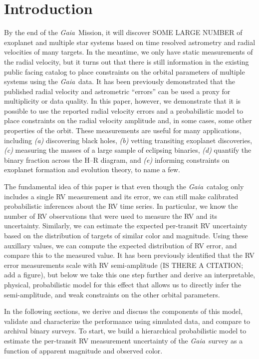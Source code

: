 \documentclass[modern, letterpaper]{aastex631}
\newcommand{\project}[1]{\textsl{#1}}
\newcommand{\Gaia}{\project{Gaia}}
\begin{document}

\section{Introduction} \label{sec:intro}

By the end of the \Gaia\ Mission, it will discover SOME LARGE NUMBER of exoplanet and multiple star systems based on time resolved astrometry and radial velocities of many targets.
In the meantime, we only have static measurements of the radial velocity, but it turns out that there is still information in the existing public facing catalog to place constraints on the orbital parameters of multiple systems using the \Gaia\ data.
It has been previously demonstrated that the published radial velocity and astrometric ``errors'' can be used a proxy for multiplicity or data quality.
In this paper, however, we demonstrate that it is possible to use the reported radial velocity errors and a probabilistic model to place constraints on the radial velocity amplitude and, in some cases, some other properties of the orbit.
These measurements are useful for many applications, including \emph{(a)} discovering black holes, \emph{(b)} vetting transiting exoplanet discoveries, \emph{(c)} measuring the masses of a large sample of eclipsing binaries, \emph{(d)} quantify the binary fraction across the H--R diagram, and \emph{(e)} informing constraints on exoplanet formation and evolution theory, to name a few.

The fundamental idea of this paper is that even though the \Gaia\ catalog only includes a single RV measurement and its error, we can still make calibrated probabilistic inferences about the RV time series.
In particular, we know the number of RV observations that were used to measure the RV and its uncertainty.
Similarly, we can estimate the expected per-transit RV uncertainty based on the distribution of targets of similar color and magnitude.
Using these auxillary values, we can compute the expected distribution of RV error, and compare this to the measured value.
It has been previously identified that the RV error measurements scale with RV semi-amplitude (IS THERE A CITATION; add a figure), but below we take this one step further and derive an interpretable, physical, probabilistic model for this effect that allows us to directly infer the semi-amplitude, and weak constraints on the other orbital parameters.

In the following sections, we derive and discuss the components of this model, validate and characterize the performance using simulated data, and compare to archival binary surveys.
To start, we build a hierarchical probabilistic model to estimate the per-transit RV measurement uncertainty of the \Gaia\ survey as a function of apparent magnitude and observed color.
\end{document}
